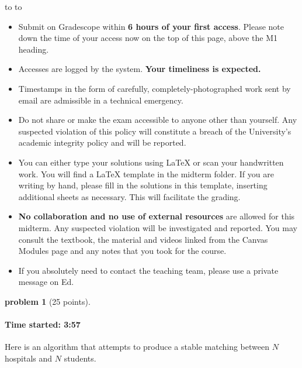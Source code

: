 \documentclass[10pt]{article}
\newcommand{\handout}{
   \renewcommand{\thepage}{\hnumber-\arabic{page}}
   \noindent
   \begin{center}
      \vbox{
    \hbox to \columnwidth {\sc{\course} --- \prof \hfill}
    \vspace{-2mm}
    \hbox to \columnwidth {\sc due \MakeLowercase{\duedate} \duelocation\hfill {\Huge\color{mdb}M\hnumber.\yourname}}
      }
   \end{center}
   \vspace*{2mm}
}
\newtheorem{problem}{\sc\color{cit}problem}
\begin{document}
\handout
\begin{itemize}

\item Submit on Gradescope within {\bf 6 hours of your first access}. Please note down the time of your access now on the top of this page, above the M1 heading.

\item Accesses are logged by the system. {\bf Your timeliness is expected.}

\item Timestamps in the form of carefully, completely-photographed work sent by email are admissible in a technical emergency.

\item Do not share or make the exam accessible to anyone other than yourself. Any suspected violation of this policy will constitute a breach of the University's academic integrity policy and will be reported.

\item You can either type your solutions using LaTeX or scan your handwritten work. You will find a LaTeX template in the midterm folder. If you are writing by hand, please fill in the solutions in this template, inserting additional sheets as necessary. This will facilitate the grading.

\item {\bf No collaboration and no use of external resources} are allowed for this midterm. Any suspected violation will be investigated and reported. You may consult the textbook, the material and videos linked from the Canvas Modules page and any notes that you took for the course. 

\item If you absolutely need to contact the teaching team, please use a private message on Ed.

\end{itemize}


\newpage
\begin{problem}[25 points]
\end{problem}

\paragraph{Time started: 3:57} 

Here is an algorithm that attempts to produce a stable matching between $N$ hospitals and $N$ students. 
\end{document}

